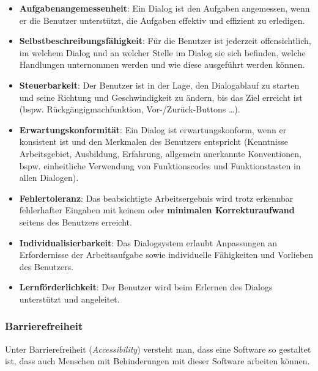 \begin{itemize}
    \item \textbf{Aufgabenangemessenheit}: Ein Dialog ist den Aufgaben angemessen, wenn er die Benutzer unterstützt, die Aufgaben effektiv und effizient zu erledigen.
    \item \textbf{Selbstbeschreibungsfähigkeit}: Für die Benutzer ist jederzeit offensichtlich, im welchem Dialog und an welcher Stelle im Dialog sie sich befinden, welche Handlungen unternommen werden und wie diese ausgeführt werden können.
    \item \textbf{Steuerbarkeit}: Der Benutzer ist in der Lage, den Dialogablauf zu starten und seine Richtung und Geschwindigkeit zu ändern, bis das Ziel erreicht ist (bspw. Rückgängigmachfunktion, Vor-/Zurück-Buttons \ldots).
    \item \textbf{Erwartungskonformität}: Ein Dialog ist erwartungskonform, wenn er konsistent ist und den Merkmalen des Benutzers entspricht (Kenntnisse Arbeitsgebiet, Ausbildung, Erfahrung, allgemein anerkannte Konventionen, bspw. einheitliche Verwendung von Funktionscodes und Funktionstasten in allen Dialogen).
    \item \textbf{Fehlertoleranz}: Das beabsichtigte Arbeitsergebnis wird trotz erkennbar fehlerhafter Eingaben mit keinem oder \textbf{minimalen Korrekturaufwand} seitens des Benutzers erreicht.
    \item \textbf{Individualisierbarkeit}: Das Dialogsystem erlaubt Anpassungen an Erfordernisse der Arbeitsaufgabe sowie individuelle Fähigkeiten und Vorlieben des Benutzers.
    \item \textbf{Lernförderlichkeit}: Der Benutzer wird beim Erlernen des Dialogs unterstützt und angeleitet.
\end{itemize}

\subsubsection*{Barrierefreiheit}
Unter Barrierefreiheit (\textit{Accessibility}) versteht man, dass eine Software so gestaltet ist, dass auch Menschen mit Behinderungen mit dieser Software arbeiten können.
